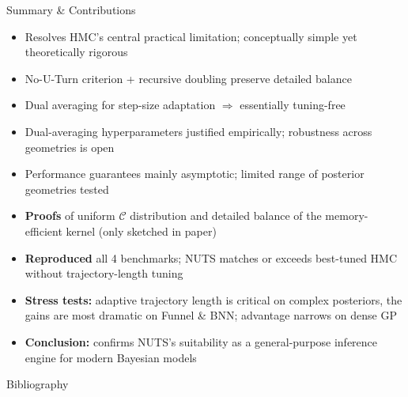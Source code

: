 \documentclass{beamer}
\begin{document}
\begin{frame}{Summary \& Contributions}
  \vspace*{-0.2cm}
  \scriptsize
  \begin{tcolorbox}[warnbox, title=Paper assessment]
    \begin{itemize}\setlength\itemsep{0.05pt}
      \item[\textcolor{green!60!black}{\textbf{+}}] Resolves HMC's central practical limitation; conceptually simple yet theoretically rigorous
      \item[\textcolor{green!60!black}{\textbf{+}}] No-U-Turn criterion + recursive doubling preserve detailed balance
      \item[\textcolor{green!60!black}{\textbf{+}}] Dual averaging for step-size adaptation $\Rightarrow$ essentially tuning-free
      \item[\textcolor{red!70!black}{\textbf{--}}] Dual-averaging hyperparameters justified empirically; robustness across geometries is open
      \item[\textcolor{red!70!black}{\textbf{--}}] Performance guarantees mainly asymptotic; limited range of posterior geometries tested
    \end{itemize} 
  \end{tcolorbox}

  \vspace{-0.1cm}
  \begin{tcolorbox}[keybox, title=Our contributions]
    \begin{itemize}\setlength\itemsep{0.05pt}
      \item \textbf{Proofs} of uniform $\mathcal{C}$ distribution and detailed balance of the memory-efficient kernel (only sketched in paper)
      \item \textbf{Reproduced} all 4 benchmarks; NUTS matches or exceeds best-tuned HMC without trajectory-length tuning
      \item \textbf{Stress tests:} adaptive trajectory length is critical on complex posteriors, the gains are most dramatic on Funnel \& BNN; advantage narrows on dense GP
      \item \textbf{Conclusion:} confirms NUTS's suitability as a general-purpose inference engine for modern Bayesian models
    \end{itemize}
  \end{tcolorbox}
\end{frame}


\begin{frame}[allowframebreaks]{Bibliography}
    \printbibliography[heading=none]
\end{frame}
\end{document}
